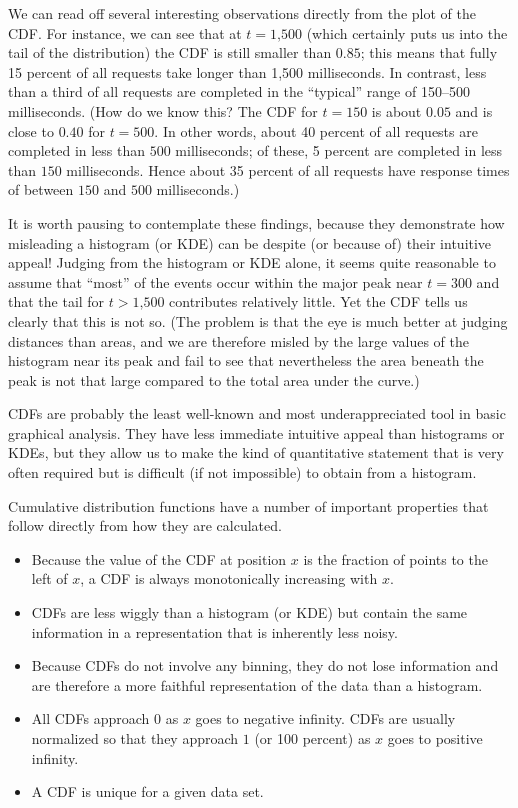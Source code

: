 We can read off several interesting observations directly from the
plot of the CDF. For instance, we can see that at $t=\text{1,500}$
(which certainly puts us into the tail of the distribution) the CDF is
still smaller than $0.85$; this means that fully 15 percent of all
requests take longer than 1,500 milliseconds. In contrast, less than a
third of all requests are completed in the ``typical'' range of
150--500 milliseconds.  (How do we know this? The CDF for $t=150$ is
about $0.05$ and is close to $0.40$ for $t=500$. In other words, about
40 percent of all requests are completed in less than $500$
milliseconds; of these, 5 percent are completed in less than $150$
milliseconds.  Hence about 35 percent of all requests have response
times of between $150$ and $500$ milliseconds.)

It is worth pausing to contemplate these findings, because they
demonstrate how misleading a histogram (or KDE) can be despite (or
because of) their intuitive appeal! Judging from the histogram or KDE
alone, it seems quite reasonable to assume that ``most'' of the events
occur within the major peak near $t=300$ and that the tail for $t >
\text{1,500}$ contributes relatively little. Yet the CDF tells us
clearly that this is not so. (The problem is that the eye is much
better at judging distances than areas, and we are therefore misled by
the large values of the histogram near its peak and fail to see that
nevertheless the area beneath the peak is not that large compared to
the total area under the curve.)

CDFs are probably the least well-known and most underappreciated tool
in basic graphical analysis. They have less immediate intuitive appeal
than histograms or KDEs, but they allow us to make the kind of
quantitative statement that is very often required but is
difficult (if not impossible) to obtain from a histogram.

Cumulative distribution functions have a number of important
properties that follow directly from how they are calculated.

\begin{itemize}
\item Because the value of the CDF at position $x$ is the fraction of
  points to the left of $x$, a CDF is always monotonically increasing
  with $x$.

\item CDFs are less wiggly than a histogram (or KDE) but contain the
  same information in a representation that is inherently less noisy.

\item Because CDFs do not involve any binning, they do not lose
  information and are therefore a more faithful representation of the
  data than a histogram.

\item All CDFs approach $0$ as $x$ goes to negative infinity. CDFs
  are usually normalized so that they approach $1$ (or 100 percent) as
  $x$ goes to positive infinity.

\item A CDF is unique for a given data set.
\end{itemize}

